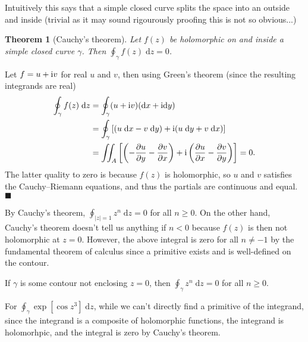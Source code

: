 \documentclass[letter-paper]{tufte-book}
\newtheorem{theorem}{\color{pastel-blue}Theorem}[section]
\newenvironment{proof}[1][Proof]{\begin{trivlist}
\item[\hskip \labelsep {\bfseries #1}]}{\end{trivlist}}
\newenvironment{example}[1][Example]{\begin{trivlist}
\item[\hskip \labelsep {\bfseries #1}]}{\end{trivlist}}
\newcommand{\dy}{\partial}
\newcommand{\ddy}[2]{\frac{\dy#1}{\dy#2}}
\newcommand{\zi}{{\rm i}}
\newcommand{\qed}{\hfill$\blacksquare$}
\begin{document}
Intuitively this says that a simple closed curve splits the space into an
outside and inside (trivial as it may sound rigourously proofing this is not so
obvious...)

\begin{theorem}[Cauchy's theorem]
  Let $f(z)$ be holomorphic on and inside a simple closed curve $\gamma$. Then
  $\oint_\gamma f(z)\; \mathrm{d}z = 0$.
\end{theorem}

\begin{proof}
  Let $f = u + \zi v$ for real $u$ and $v$, then using Green's theorem (since
  the resulting integrands are real)
  \begin{align*}
    \oint_\gamma f(z)\; \mathrm{d}z &= \oint_\gamma (u + \zi v)(\mathrm{d}x + \zi \mathrm{d}y) \\
      &= \oint_\gamma \left[(u\; \mathrm{d}x - v\; \mathrm{d}y) + \zi(u\; \mathrm{d}y + v\; \mathrm{d}x) \right]\\
      &= \iint_A \left[\left(-\ddy{u}{y} -\ddy{v}{x}\right) + \zi \left(\ddy{u}{x} - \ddy{v}{y}\right)\right] = 0.
  \end{align*}
  The latter quality to zero is because $f(z)$ is holomorphic, so $u$ and $v$
  satisfies the Cauchy--Riemann equations, and thus the partials are continuous
  and equal. \qed
\end{proof}

\begin{example}
By Cauchy's theorem, $\oint_{|z| = 1} z^n\; \mathrm{d}z = 0$ for all $n \geq 0$.
On the other hand, Cauchy's theorem doesn't tell us anything if $n < 0$ because
$f(z)$ is then not holomorphic at $z=0$. However, the above integral is zero for
all $n \neq -1$ by the fundamental theorem of calculus since a primitive exists
and is well-defined on the contour.

If $\gamma$ is some contour not enclosing $z = 0$, then $\oint_\gamma z^n\;
\mathrm{d}z = 0$ for all $n \geq 0$.
\end{example}

\begin{example}
  For $\oint_\gamma \exp[\cos z^3]\; \mathrm{d}z$, while we can't directly find
  a primitive of the integrand, since the integrand is a composite of
  holomorphic functions, the integrand is holomorhpic, and the integral is zero
  by Cauchy's theorem.
\end{example}
\end{document}
